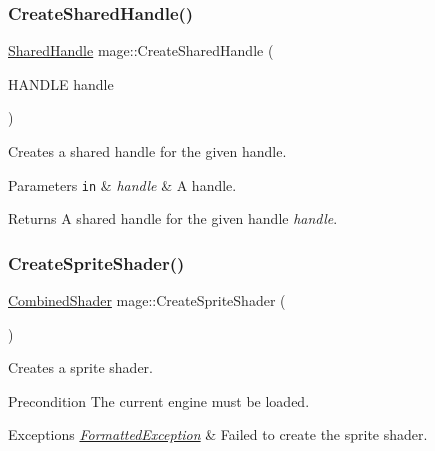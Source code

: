 \hypertarget{namespacemage_a3119898d7caac71d8ee495c3ae3194b1}{}\label{namespacemage_a3119898d7caac71d8ee495c3ae3194b1} 
\subsubsection{\texorpdfstring{Create\+Shared\+Handle()}{CreateSharedHandle()}}
{\footnotesize\ttfamily \hyperlink{namespacemage_ab892828913d6129acf71e0cec60467e5}{Shared\+Handle} mage\+::\+Create\+Shared\+Handle (\begin{DoxyParamCaption}\item[{H\+A\+N\+D\+LE}]{handle }\end{DoxyParamCaption})}

Creates a shared handle for the given handle.


\begin{DoxyParams}[1]{Parameters}
\mbox{\tt in}  & {\em handle} & A handle. \\
\hline
\end{DoxyParams}
\begin{DoxyReturn}{Returns}
A shared handle for the given handle {\itshape handle}. 
\end{DoxyReturn}
\hypertarget{namespacemage_af6f5c6ae46131caa77e5361d23d5d7c8}{}\label{namespacemage_af6f5c6ae46131caa77e5361d23d5d7c8} 
\subsubsection{\texorpdfstring{Create\+Sprite\+Shader()}{CreateSpriteShader()}}
{\footnotesize\ttfamily \hyperlink{structmage_1_1_combined_shader}{Combined\+Shader} mage\+::\+Create\+Sprite\+Shader (\begin{DoxyParamCaption}{ }\end{DoxyParamCaption})}

Creates a sprite shader.

\begin{DoxyPrecond}{Precondition}
The current engine must be loaded. 
\end{DoxyPrecond}

\begin{DoxyExceptions}{Exceptions}
{\em \hyperlink{structmage_1_1_formatted_exception}{Formatted\+Exception}} & Failed to create the sprite shader. \\
\hline
\end{DoxyExceptions}
\hypertarget{namespacemage_a6d7b762686800ea46b6f56dbfa0727a2}{}\label{namespacemage_a6d7b762686800ea46b6f56dbfa0727a2} 
